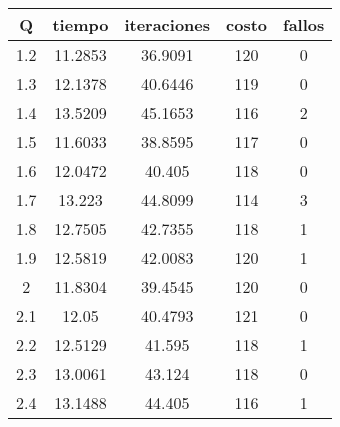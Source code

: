 \begin{table}[h!]
\centering
\begin{tabular}{ccccc}
Q & tiempo & iteraciones & costo & fallos \\ 
\hline 
1.2 & 11.2853 & 36.9091 & 120 & 0 \\ 
1.3 & 12.1378 & 40.6446 & 119 & 0 \\ 
1.4 & 13.5209 & 45.1653 & 116 & 2 \\ 
1.5 & 11.6033 & 38.8595 & 117 & 0 \\ 
1.6 & 12.0472 & 40.405 & 118 & 0 \\ 
1.7 & 13.223 & 44.8099 & 114 & 3 \\ 
1.8 & 12.7505 & 42.7355 & 118 & 1 \\ 
1.9 & 12.5819 & 42.0083 & 120 & 1 \\ 
2 & 11.8304 & 39.4545 & 120 & 0 \\ 
2.1 & 12.05 & 40.4793 & 121 & 0 \\ 
2.2 & 12.5129 & 41.595 & 118 & 1 \\ 
2.3 & 13.0061 & 43.124 & 118 & 0 \\ 
2.4 & 13.1488 & 44.405 & 116 & 1 \\ 
\hline 
\end{tabular}
\end{table}